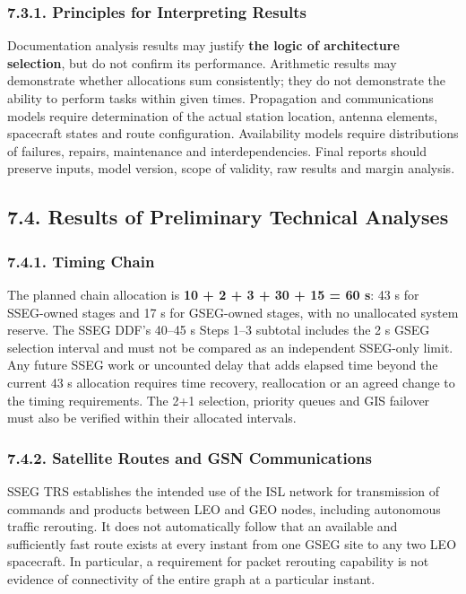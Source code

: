 \subsubsection{7.3.1. Principles for Interpreting Results}\label{ddjf-7-3-1}

Documentation analysis results may justify \textbf{the logic of architecture selection}, but do not confirm its performance. Arithmetic results may demonstrate whether allocations sum consistently; they do not demonstrate the ability to perform tasks within given times. Propagation and communications models require determination of the actual station location, antenna elements, spacecraft states and route configuration. Availability models require distributions of failures, repairs, maintenance and interdependencies. Final reports should preserve inputs, model version, scope of validity, raw results and margin analysis.

\subsection{7.4. Results of Preliminary Technical Analyses}\label{ddjf-7-4}

\subsubsection{7.4.1. Timing Chain}\label{ddjf-7-4-1}

The planned chain allocation is \textbf{10 + 2 + 3 + 30 + 15 = 60 s}: 43 s for SSEG-owned stages and 17 s for GSEG-owned stages, with no unallocated system reserve. The SSEG DDF's 40--45 s Steps 1--3 subtotal includes the 2 s GSEG selection interval and must not be compared as an independent SSEG-only limit. Any future SSEG work or uncounted delay that adds elapsed time beyond the current 43 s allocation requires time recovery, reallocation or an agreed change to the timing requirements. The 2+1 selection, priority queues and GIS failover must also be verified within their allocated intervals.

\subsubsection{7.4.2. Satellite Routes and GSN Communications}\label{ddjf-7-4-2}

SSEG TRS establishes the intended use of the ISL network for transmission of commands and products between LEO and GEO nodes, including autonomous traffic rerouting. It does not automatically follow that an available and sufficiently fast route exists at every instant from one GSEG site to any two LEO spacecraft. In particular, a requirement for packet rerouting capability is not evidence of connectivity of the entire graph at a particular instant.

